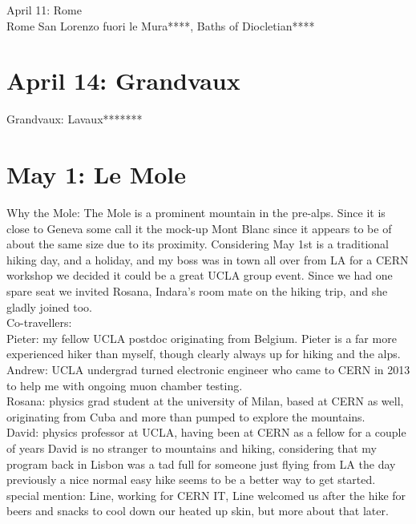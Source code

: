 April 11: Rome\\
Rome San Lorenzo fuori le Mura****, Baths of Diocletian****

\section{April 14: Grandvaux}
\label{Lavaux2013}

Grandvaux: Lavaux*******

\section{May 1: Le Mole}
\label{Mole2013}

Why the Mole: The Mole is a prominent mountain in the pre-alps. Since it is close to Geneva some call it the mock-up Mont Blanc since it appears to be of about the same size due to its proximity. Considering May 1st is a traditional hiking day, and a holiday, and my boss was in town all over from LA for a CERN workshop we decided it could be a great UCLA group event. Since we had one spare seat we invited Rosana, Indara's room mate on the hiking trip, and she gladly joined too.\\

Co-travellers:\\
Pieter: my fellow UCLA postdoc originating from Belgium. Pieter is a far more experienced hiker than myself, though clearly always up for hiking and the alps.\\
Andrew: UCLA undergrad turned electronic engineer who came to CERN in 2013 to help me with ongoing muon chamber testing.\\
Rosana: physics grad student at the university of Milan, based at CERN as well, originating from Cuba and more than pumped to explore the mountains.\\
David: physics professor at UCLA, having been at CERN as a fellow for a couple of years David is no stranger to mountains and hiking, considering that my program back in Lisbon was a tad full for someone just flying from LA the day previously a nice normal easy hike seems to be a better way to get started.\\
special mention: Line, working for CERN IT, Line welcomed us after the hike for beers and snacks to cool down our heated up skin, but more about that later.\\

